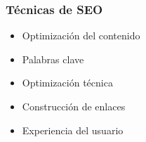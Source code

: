 \documentclass[
10pt, %
aspectratio=169, %
]{beamer}
\begin{document}
	\begin{frame}
		
		\frametitle{Técnicas de SEO}
		
		\begin{itemize}
			\item Optimización del contenido
			
			\item Palabras clave
			
			\item Optimización técnica
			
			\item Construcción de enlaces
			
			\item Experiencia del usuario
			
		\end{itemize}
		
		
	\end{frame}
	
\end{document}
